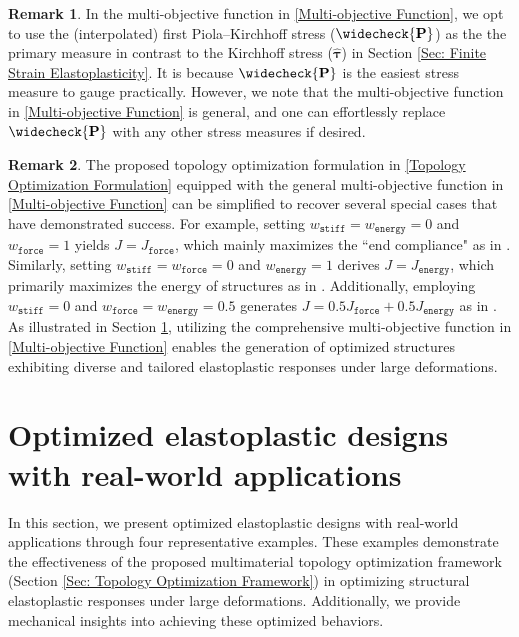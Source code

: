 \documentclass[preprint,11pt]{elsarticle}
\theoremstyle{definition}
\newtheorem{remark}{Remark}
\begin{document}
\begin{remark}
In the multi-objective function in \eqref{Multi-objective Function}, we opt to use the (interpolated) first Piola--Kirchhoff stress ($\widecheck{\mathbf{P}}$) as the the primary measure in contrast to the Kirchhoff stress ($\widehat{\boldsymbol{\tau}}$) in Section \ref{Sec: Finite Strain Elastoplasticity}. It is because $\widecheck{\mathbf{P}}$ is the easiest stress measure \citep{kumar_phase-field_2020} to gauge practically. However, we note that the multi-objective function in \eqref{Multi-objective Function} is general, and one can effortlessly replace $\widecheck{\mathbf{P}}$ with any other stress measures if desired.
\end{remark}

\begin{remark}
The proposed topology optimization formulation in \eqref{Topology Optimization Formulation} equipped with the general multi-objective function in \eqref{Multi-objective Function} can be simplified to recover several special cases that have demonstrated success. For example, setting $w_\texttt{stiff} = w_\texttt{energy} = 0$ and $w_\texttt{force}=1$ yields $J = J_\texttt{force}$, which mainly maximizes the ``end compliance" as in \citet{ivarsson_plastic_2021}. Similarly, setting $w_\texttt{stiff} = w_\texttt{force} = 0$ and $w_\texttt{energy} = 1$ derives $J = J_\texttt{energy}$, which primarily maximizes the energy of structures as in \citet{wallin_topology_2016}. Additionally, employing $w_\texttt{stiff} = 0$ and $w_\texttt{force} = w_\texttt{energy} = 0.5$ generates $J = 0.5 J_\texttt{force} + 0.5 J_\texttt{energy}$ as in \citet{abueidda_topology_2021}. As illustrated in Section \ref{Sec: Sample Examples}, utilizing the comprehensive multi-objective function in \eqref{Multi-objective Function} enables the generation of optimized structures exhibiting diverse and tailored elastoplastic responses under large deformations.
\end{remark}


\section{Optimized elastoplastic designs with real-world applications}
\label{Sec: Sample Examples}

In this section, we present optimized elastoplastic designs with real-world applications through four representative examples. These examples demonstrate the effectiveness of the proposed multimaterial topology optimization framework (Section \ref{Sec: Topology Optimization Framework}) in optimizing structural elastoplastic responses under large deformations. Additionally, we provide mechanical insights into achieving these optimized behaviors.
\end{document}

